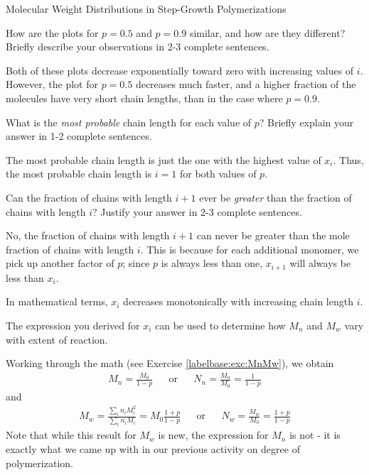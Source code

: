 \begin{activity}{Molecular Weight Distributions in Step-Growth Polymerizations}
\begin{ctqs}
	\clearpage
	\question How are the plots for $p=0.5$ and $p=0.9$ similar, and how are they different?  Briefly describe your observations in 2-3 complete sentences.
	
		\begin{solution}[1.5in]
		
			Both of these plots decrease exponentially toward zero with increasing values of $i$.  However, the plot for $p=0.5$ decreases much faster, and a higher fraction of the molecules have very short chain lengths, than in the case where $p=0.9$.
		\end{solution}
	
	\question What is the \emph{most probable} chain length for each value of $p$?  Briefly explain your answer in 1-2 complete sentences.
	
		\begin{solution}[1.5in]
		
			The most probable chain length is just the one with the highest value of $x_i$.  Thus, the most probable chain length is $i=1$ for both values of $p$.
		
		\end{solution}
	
	\question Can the fraction of chains with length $i+1$ ever be \emph{greater} than the fraction of chains with length $i$?  Justify your answer in 2-3 complete sentences.
	
		\begin{solution}[1.5in]
		
			No, the fraction of chains with length $i+1$ can never be greater than the mole fraction of chains with length $i$.  This is because for each additional monomer, we pick up another factor of $p$; since $p$ is always less than one, $x_{i+1}$ will always be less than $x_i$.
			
			In mathematical terms, $x_i$ decreases monotonically with increasing chain length $i$.
		
		\end{solution}
	
\end{ctqs}

\clearpage
\begin{model}
\label{\labelbase:mdl:MwMn}

	The expression you derived for $x_i$ can be used to determine how $M_n$ and $M_w$ vary with extent of reaction.
	
	Working through the math (see Exercise \ref{labelbase:exc:MnMw}), we obtain
	\begin{align*}
		M_n = \frac{M_0}{1-p} && \text{or} && N_n = \frac{M_n}{M_0} = \frac{1}{1-p}
	\end{align*}
	and
	\begin{align*}
		M_w = \frac{\sum_i n_i M_i^2}{\sum_i n_i M_i} = M_0\frac{1+p}{1-p} && \text{or} && N_w = \frac{M_w}{M_0} = \frac{1+p}{1-p}
	\end{align*}
	Note that while this result for $M_w$ is new, the expression for $M_n$ is not - it is exactly what we came up with in our previous activity on degree of polymerization.


\end{model}
\end{activity}
